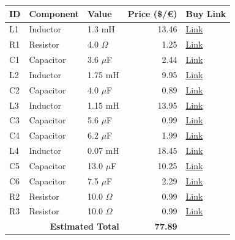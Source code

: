 \documentclass[11pt,a4paper]{report}
\begin{document}
\vspace{0.5cm}
\begin{table}[H]
    \centering
    \renewcommand{\arraystretch}{1.5}
    \begin{tabular}{@{}lllrl@{}}
        \toprule
        \textbf{ID} & \textbf{Component} & \textbf{Value} & \textbf{Price (\$/€)} & \textbf{Buy Link} \\
        \midrule
        L1 & Inductor & 1.3 mH & 13.46 & \href{https://www.soundimports.eu/en/jantzen-audio-000-5005.html}{Link} \\
        R1 & Resistor & 4.0 $\Omega$ & 1.25 & \href{https://www.parts-express.com/Dayton-Audio-DNR-4.0-4-Ohm-10W-Precision-Audio-Grade-Resisto-004-4}{Link} \\
        C1 & Capacitor & 3.6 $\mu$F & 2.44 & \href{https://www.soundimports.eu/en/jantzen-audio-001-0244.html}{Link} \\
        L2 & Inductor & 1.75 mH & 9.95 & \href{https://www.soundimports.eu/en/jantzen-audio-000-5586.html}{Link} \\
        C2 & Capacitor & 4.0 $\mu$F & 0.89 & \href{https://www.parts-express.com/4.0uF-100V-Non-Polarized-Capacitor-027-330}{Link} \\
        L3 & Inductor & 1.15 mH & 13.95 & \href{https://www.soundimports.eu/en/jantzen-audio-000-1625.html}{Link} \\
        C3 & Capacitor & 5.6 $\mu$F & 0.99 & \href{https://www.parts-express.com/5.6uF-100V-Non-Polarized-Capacitor-027-334}{Link} \\
        C4 & Capacitor & 6.2 $\mu$F & 1.99 & \href{https://www.parts-express.com/Dayton-Audio-PMPC-6.2-6.2uF-250V-Precision-Audio-Capacitor-027-236}{Link} \\
        L4 & Inductor & 0.07 mH & 18.45 & \href{https://www.soundimports.eu/en/jantzen-audio-000-7615.html}{Link} \\
        C5 & Capacitor & 13.0 $\mu$F & 10.25 & \href{https://www.soundimports.eu/en/audyn-q4-13-0-400.html}{Link} \\
        C6 & Capacitor & 7.5 $\mu$F & 2.29 & \href{https://www.parts-express.com/Solen-7.5uF-400V-Polypropylene-Capacitor-027-562}{Link} \\
        R2 & Resistor & 10.0 $\Omega$ & 0.99 & \href{https://www.soundimports.eu/en/jantzen-audio-002-0802.html}{Link} \\
        R3 & Resistor & 10.0 $\Omega$ & 0.99 & \href{https://www.soundimports.eu/en/jantzen-audio-002-0802.html}{Link} \\
        \midrule
        \multicolumn{3}{r}{\textbf{Estimated Total}} & \textbf{77.89} & \\
        \bottomrule
    \end{tabular}
\end{table}
\end{document}
